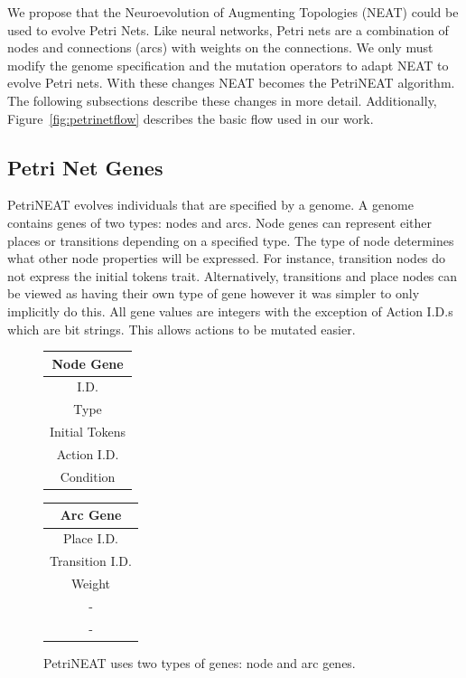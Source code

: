 \documentclass[12pt,a4paper,twocolumn]{article}
\begin{document}
We propose that the Neuroevolution of Augmenting Topologies (NEAT) could be used to evolve Petri Nets. Like neural networks, Petri nets are a combination of nodes and connections (arcs) with weights on the connections. We only must modify the genome specification and the mutation operators to adapt NEAT to evolve Petri nets. With these changes NEAT becomes the PetriNEAT algorithm. The following subsections describe these changes in more detail. Additionally, Figure~\ref{fig:petrinetflow} describes the basic flow used in our work.

\subsection{Petri Net Genes}

PetriNEAT evolves individuals that are specified by a genome. A genome contains genes of two types: nodes and arcs. Node genes can represent either places or transitions depending on a specified type. The type of node determines what other node properties will be expressed. For instance, transition nodes do not express the initial tokens trait. Alternatively, transitions and place nodes can be viewed as having their own type of gene however it was simpler to only implicitly do this. All gene values are integers with the exception of Action I.D.s which are bit strings. This allows actions to be mutated easier.

\begin{figure}
\centering
\begin{tabular}{|c|}
\hline
Node Gene\\ \hline
I.D. \\
Type \\
Initial Tokens \\
Action I.D. \\
Condition \\
\hline
\end{tabular}
\begin{tabular}{|c|}
\hline
Arc Gene\\ \hline
Place I.D.\\
Transition I.D.\\
Weight \\
 - \\
 -\\
\hline
\end{tabular}
\caption{PetriNEAT uses two types of genes: node and arc genes.}
\end{figure}
\end{document}
